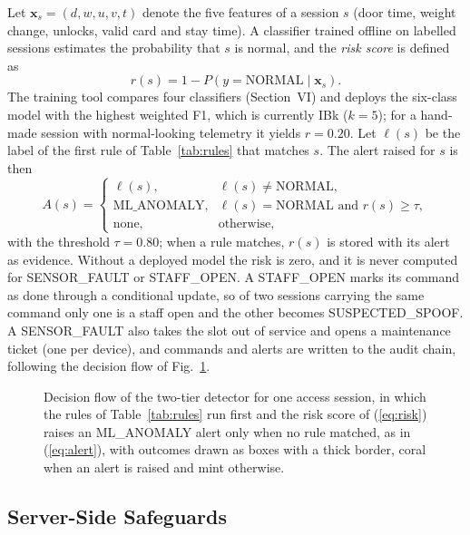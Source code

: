Let $\mathbf{x}_s = (d, w, u, v, t)$ denote the five features of a session $s$ (door time, weight change, unlocks,
valid card and stay time). A classifier trained offline on labelled sessions estimates the probability that $s$ is
normal, and the \emph{risk score} is defined as
\begin{equation}
r(s) = 1 - P\left(y = \text{NORMAL} \mid \mathbf{x}_s\right).
\label{eq:risk}
\end{equation}
The training tool compares four classifiers (Section~VI) and deploys the six-class model with the highest weighted F1,
which is currently IBk ($k=5$); for a hand-made session with normal-looking telemetry it yields $r = 0.20$. Let
$\ell(s)$ be the label of the first rule of Table~\ref{tab:rules} that matches $s$. The alert raised for $s$ is then
\begin{equation}
A(s) =
\begin{cases}
\ell(s), & \ell(s) \neq \text{NORMAL},\\
\text{ML\_ANOMALY}, & \ell(s) = \text{NORMAL} \text{ and } r(s) \geq \tau,\\
\text{none}, & \text{otherwise},
\end{cases}
\label{eq:alert}
\end{equation}
with the threshold $\tau = 0.80$; when a rule matches, $r(s)$ is stored with its alert as evidence. Without a
deployed model the risk is zero, and it is never computed for SENSOR\_FAULT or STAFF\_OPEN. A STAFF\_OPEN marks its
command as done through a conditional update, so of two sessions carrying the same command only one is a staff open and
the other becomes SUSPECTED\_SPOOF. A SENSOR\_FAULT also takes the slot out of service and opens a maintenance ticket
(one per device), and commands and alerts are written to the audit chain, following the decision flow of
Fig.~\ref{fig:flow}.

\begin{figure}[!htbp]
\centering

\caption{Decision flow of the two-tier detector for one access session, in which the rules of Table~\ref{tab:rules}
run first and the risk score of (\ref{eq:risk}) raises an ML\_ANOMALY alert only when no rule matched, as in
(\ref{eq:alert}), with outcomes drawn as boxes with a thick border, coral when an alert is raised and mint otherwise.}
\label{fig:flow}
\end{figure}

\subsection{Server-Side Safeguards}

